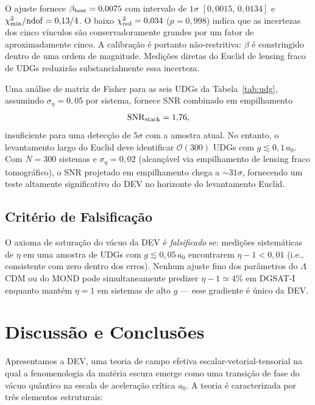\documentclass[aps,prd,twocolumn,showpacs,superscriptaddress]{revtex4-2}
\newcommand{\aO}{a_0}
\newcommand{\LCDM}{$\Lambda$CDM}
\begin{document}
O ajuste fornece $\beta_{\rm best} = 0{,}0075$ com intervalo de
$1\sigma$ $[0{,}0015,\, 0{,}0134]$ e $\chi^2_{\rm min}/{\rm ndof} = 0{,}13/4$.
O baixo $\chi^2_{\rm red} = 0{,}034$ ($p = 0{,}998$) indica que as
incertezas dos cinco vínculos são conservadoramente grandes por
um fator de aproximadamente cinco.
A calibração é portanto não-restritiva: $\beta$ é constringido
dentro de uma ordem de magnitude.
Medições diretas do Euclid de lensing fraco de UDGs reduzirão
substancialmente essa incerteza.

Uma análise de matriz de Fisher para as seis UDGs da
Tabela~\ref{tab:udg}, assumindo $\sigma_\eta = 0{,}05$ por sistema,
fornece SNR combinado em empilhamento
\begin{equation}
  {\rm SNR}_{\rm stack} = 1{,}76,
\end{equation}
insuficiente para uma detecção de $5\sigma$ com a amostra atual.
No entanto, o levantamento largo do Euclid deve identificar
$\mathcal{O}(300)$ UDGs com $g \lesssim 0{,}1\,\aO$.
Com $N = 300$ sistemas e $\sigma_\eta = 0{,}02$ (alcançável via
empilhamento de lensing fraco tomográfico), o SNR projetado
em empilhamento chega a ${\sim}31\sigma$, fornecendo um teste
altamente significativo do DEV no horizonte do levantamento Euclid.

\subsection{Critério de Falsificação}

O axioma de saturação do vácuo da DEV é \emph{falsificado} se:
medições sistemáticas de $\eta$ em uma amostra de UDGs com
$g \lesssim 0{,}05\,\aO$ encontrarem $\eta - 1 < 0{,}01$
(i.e., consistente com zero dentro dos erros).
Nenhum ajuste fino dos parâmetros do \LCDM{} ou do MOND pode
simultaneamente predizer $\eta - 1 \simeq 4\%$ em DGSAT-I enquanto
mantém $\eta = 1$ em sistemas de alto $g$ — esse gradiente é
único da DEV.

\section{Discussão e Conclusões}
\label{sec:conclusion}

Apresentamos a DEV, uma teoria de campo efetiva
escalar-vetorial-tensorial na qual a fenomenologia da matéria
escura emerge como uma transição de fase do vácuo quântico na
escala de aceleração crítica $\aO$.
A teoria é caracterizada por três elementos estruturais:
\end{document}
